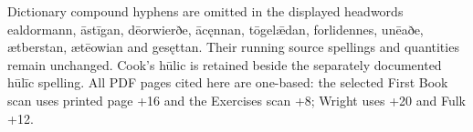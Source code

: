Dictionary compound hyphens are omitted in the displayed headwords ealdormann, āstīgan, dēorwierðe, ācęnnan, tōgelǣdan, forlidennes, unēaðe, ætberstan, ætēowian and gesęttan. Their running source spellings and quantities remain unchanged. Cook’s hūlic is retained beside the separately documented hūlīc spelling. All PDF pages cited here are one-based: the selected First Book scan uses printed page +16 and the Exercises scan +8; Wright uses +20 and Fulk +12.

\endgroup

